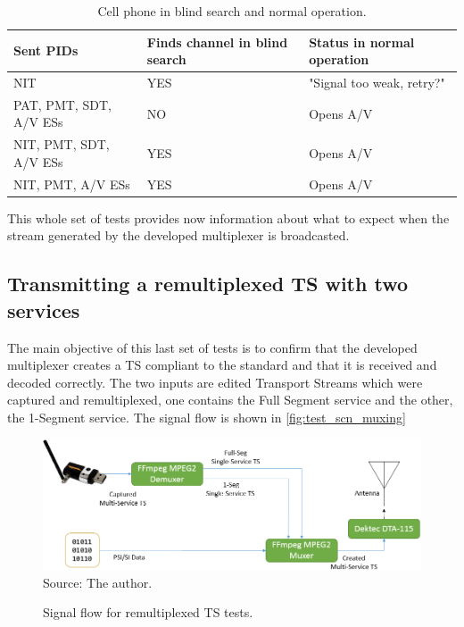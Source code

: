 \documentclass[
	12pt,				%
	openright,			%
	twoside,			%
	a4paper,			%
	brazil,
	french,				%
	english
	]{abntex2}
\begin{document}
\begin{table}
    \caption {Cell phone in blind search and normal operation.}
    \begin{center}
\begin{tabular}{|l|l|l|}
    \hline
    Sent PIDs              & Finds channel in blind search & Status in normal operation \\ \hline
    NIT                    & YES                           & "Signal too weak, retry?"  \\ \hline
    PAT, PMT, SDT, A/V ESs & NO                            & Opens A/V                  \\ \hline
    NIT, PMT, SDT, A/V ESs & YES                           & Opens A/V                  \\ \hline
    NIT, PMT, A/V ESs      & YES                           & Opens A/V                  \\ \hline
    \end{tabular}
	\label{tab_cell}
\end{center}
\end{table}

This whole set of tests provides now information about what to expect when the stream generated by the developed multiplexer is broadcasted.

\subsection{Transmitting a remultiplexed TS with two services}
\label{test_remultiplexing}

The main objective of this last set of tests is to confirm that the developed multiplexer creates a TS compliant to the standard and that it is received and decoded correctly. The two inputs are edited Transport Streams which were captured and remultiplexed, one contains the Full Segment service and the other, the 1-Segment service. The signal flow is shown in \autoref{fig:test_scn_muxing}

\begin{figure}[!h]
\centering
\caption{Signal flow for remultiplexed TS tests.}
\includegraphics[width=0.8\linewidth]{figuras/test_scn_muxing.png}
\\Source: The author.
\label{fig:test_scn_muxing}
\end{figure}
\end{document}
